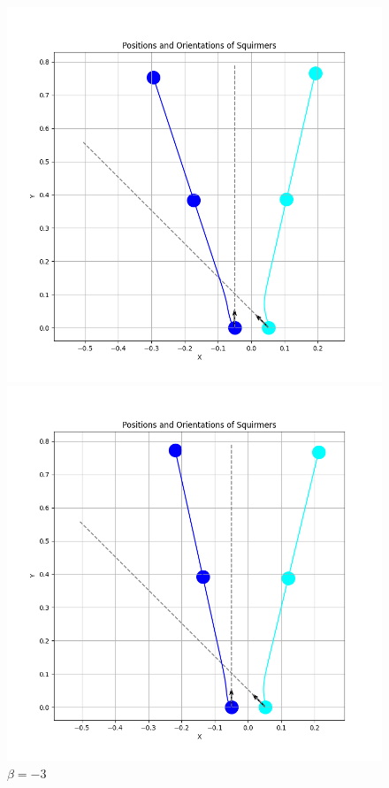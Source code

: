 \documentclass{article}
\begin{document}
\begin{figure}[H]
\begin{minipage}{0.49\textwidth}
        \caption{\footnotesize $\beta = 3$}
    \end{minipage}
    \begin{minipage}{0.49\textwidth}
        \includegraphics[width=1.1\textwidth]{graphs/simulations/sim_sq_sq/betam1_5/3pi_4_.png}
        \caption{\footnotesize $\beta = -1.5$}
    \end{minipage}\hfill
    \begin{minipage}{0.49\textwidth}
        \includegraphics[width=1.1\textwidth]{graphs/simulations/sim_sq_sq/betam3/3pi_4_.png}
        \caption{\footnotesize $\beta = -3$}
    \end{minipage}
\end{figure}
\end{document}

